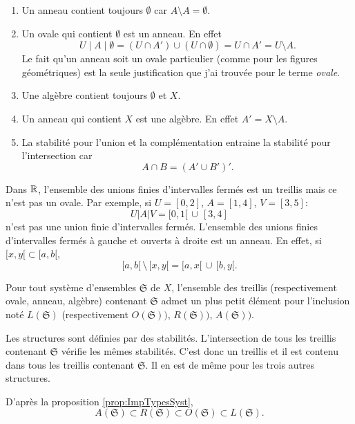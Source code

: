 \begin{rems}
 \begin{enumerate}
  \item Un anneau contient toujours $\emptyset$ car $A \setminus A = \emptyset$.
  \item Un ovale qui contient $\emptyset$ est un anneau. En effet
    \begin{displaymath}
      U \mid A \mid \emptyset = (U \cap A')\cup (U \cap \emptyset) = U \cap A' = U \setminus A.
    \end{displaymath}
    Le fait qu'un anneau soit un ovale particulier (comme pour les figures géométriques) est la seule justification que j'ai trouvée pour le terme \emph{ovale}.
  \item Une algèbre contient toujours $\emptyset$ et $X$.
  \item Un anneau qui contient $X$ est une algèbre. En effet $A' = X \setminus A$.
  \item La stabilité pour l'union et la complémentation entraine la stabilité pour l'intersection car
  \begin{displaymath}
   A \cap B = \left(A' \cup B'\right)'.
  \end{displaymath}

 \end{enumerate}
\end{rems}
\begin{exples}
 Dans $\mathbb{R}$, l'ensemble des unions finies d'intervalles fermés est un treillis mais ce n'est pas un ovale. Par exemple, si $U = [0,2]$, $A=[1,4]$, $V = [3,5]$:
 \begin{displaymath}
  U|A|V = [0,1[ \, \cup \, [3,4]
 \end{displaymath}
n'est pas une union finie d'intervalles fermés.\newline
L'ensemble des unions finies d'intervalles fermés à gauche et ouverts à droite est un anneau. En effet, si $[x,y[ \subset [a,b[$,
\begin{displaymath}
 [a,b[ \,\setminus \, [x,y[ = [a,x[ \, \cup \, [b,y[.
\end{displaymath}
\end{exples}

\begin{propn}
  Pour tout système d'ensembles $\mathfrak{S}$ de $X$, l'ensemble des treillis (respectivement ovale, anneau, algèbre) contenant $\mathfrak{S}$ admet un plus petit élément pour l'inclusion noté $L(\mathfrak{S})$ (respectivement $O(\mathfrak{S}))$, $R(\mathfrak{S}))$, $A(\mathfrak{S}))$.
\end{propn}
\begin{demo}
Les structures sont définies par des stabilités. L'intersection de tous les treillis contenant $\mathfrak{S}$ vérifie les mêmes stabilités. C'est donc un treillis et il est contenu dans tous les treillis contenant $\mathfrak{S}$. Il en est de même pour les trois autres structures.
\end{demo}
D'après la proposition \ref{prop:ImpTypesSyst},
\begin{displaymath}
 A(\mathfrak{S}) \subset R(\mathfrak{S}) \subset O(\mathfrak{S}) \subset L(\mathfrak{S}).
\end{displaymath}

